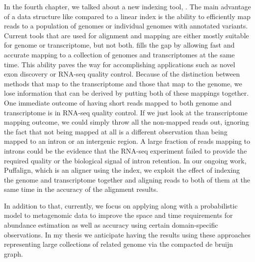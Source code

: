 In the fourth chapter, we talked about a new indexing tool, \pufferfish.
The main advantage of a data structure like \pufferfish compared to a linear index
is the ability to efficiently map reads to a population of genomes or individual genomes
with annotated variants.
Current tools that are used for alignment and mapping are either mostly suitable for genome or transcriptome,
but not both. \pufferfish fills the gap by allowing fast and accurate mapping
to a collection of genomes and transcriptomes at the same time.
This ability paves the way for accomplishing applications such as novel exon discovery
or RNA-seq quality control.
Because of the distinction between methods that map to the transcriptome
and those that map to the genome,
we lose information that can be derived by putting both of these mappings together.
One immediate outcome of having short reads mapped to both genome and transcriptome
is in RNA-seq quality control.
If we just look at the transcriptome mapping outcome,
we could simply throw all the non-mapped reads out,
ignoring the fact that not being mapped at all
is a different observation than being mapped to an intron or an intergenic region.
A large fraction of reads mapping to introns could be the evidence that the RNA-seq experiment
failed to provide the required quality or the biological signal of intron retention.
In our ongoing work, Puffalign, which is an aligner using the \pufferfish index,
we exploit the effect of indexing the genome and transcriptome together and aligning reads to
both of them at the same time in the accuracy of the alignment results.

In addition to that, currently, we focus on applying \pufferfish
along with a probabilistic model to metagenomic data
to improve the space and time requirements for abundance estimation
as well as accuracy using certain domain-specific observations.
In my thesis we anticipate having the results using these approaches
representing large collections of related genome via the compacted de bruijn graph.



